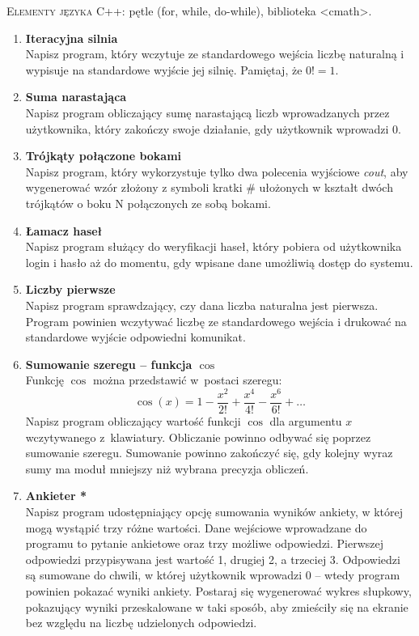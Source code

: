 \documentclass[12pt]{article}
\begin{document}
\small \textsc{Elementy języka C++:} pętle (for, while, do-while), biblioteka <cmath>.

\begin{enumerate}

\item \textbf{Iteracyjna silnia}\\
Napisz program, który wczytuje ze standardowego wejścia liczbę naturalną i wypisuje na standardowe wyjście jej silnię. Pamiętaj, że $0!=1$.

\item \textbf{Suma narastająca}\\
Napisz program obliczający sumę narastającą liczb wprowadzanych przez użytkownika, który zakończy swoje działanie, gdy użytkownik wprowadzi 0.

\item \textbf{Trójkąty połączone bokami}\\
Napisz program, który wykorzystuje tylko dwa polecenia wyjściowe \textit{cout}, aby wygenerować wzór złożony z symboli kratki \# ułożonych w kształt dwóch trójkątów o boku N połączonych ze sobą bokami.

\item \textbf{Łamacz haseł}\\
Napisz program służący do weryfikacji haseł, który pobiera od użytkownika login i hasło aż do momentu, gdy wpisane dane umożliwią dostęp do systemu.

\item \textbf{Liczby pierwsze}\\
Napisz program sprawdzający, czy dana liczba naturalna jest pierwsza. Program powinien wczytywać liczbę ze standardowego wejścia i drukować na standardowe wyjście odpowiedni komunikat.

\item \textbf{Sumowanie szeregu -- funkcja $\cos$}\\
Funkcję $\cos$ można przedstawić w~postaci szeregu:
\[
\cos (x) = 1 - \frac{x^2}{2!} + \frac{x^4}{4!} - \frac{x^6}{6!} + \dots
\]
Napisz program obliczający wartość funkcji $\cos$ dla argumentu $x$ wczytywanego z~klawiatury. Obliczanie powinno odbywać się poprzez sumowanie szeregu. Sumowanie powinno zakończyć się, gdy kolejny wyraz sumy ma moduł mniejszy niż wybrana precyzja obliczeń.

\item \textbf{Ankieter *}\\
Napisz program udostępniający opcję sumowania wyników ankiety, w której mogą wystąpić trzy różne wartości. Dane wejściowe wprowadzane do programu to pytanie ankietowe oraz trzy możliwe odpowiedzi. Pierwszej odpowiedzi przypisywana jest wartość 1, drugiej 2, a trzeciej 3. Odpowiedzi są sumowane do chwili, w której użytkownik wprowadzi 0 -- wtedy program powinien pokazać wyniki ankiety. Postaraj się wygenerować wykres słupkowy, pokazujący wyniki przeskalowane w taki sposób, aby zmieściły się na ekranie bez względu na liczbę udzielonych odpowiedzi.



\end{enumerate}
\end{document}
